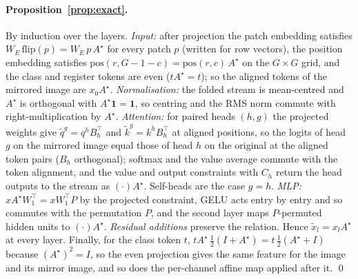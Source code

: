 \paragraph{Proposition~\ref{prop:exact}.} By induction over the layers. \emph{Input:} after projection the patch
embedding satisfies $W_E\,\mathrm{flip}(p) = W_E\,p\,A^\star$ for every patch $p$ (written for row vectors), the position
embedding satisfies $\mathrm{pos}(r, G-1-c) = \mathrm{pos}(r,c)\,A^\star$ on the $G\times G$ grid, and the class and
register tokens are even ($t A^\star = t$); so the aligned tokens of the mirrored image are $x_0 A^\star$.
\emph{Normalisation:} the folded stream is mean-centred and $A^\star$ is orthogonal with $A^\star\mathbf{1} =
\mathbf{1}$, so centring and the RMS norm commute with right-multiplication by $A^\star$. \emph{Attention:} for paired
heads $(h,g)$ the projected weights give $\tilde q^{g} = q^{h} B_h^\top$ and $\tilde k^{g} = k^{h} B_h^\top$ at aligned
positions, so the logits of head $g$ on the mirrored image equal those of head $h$ on the original at the aligned token
pairs ($B_h$ orthogonal); softmax and the value average commute with the token alignment, and the value and output
constraints with $C_h$ return the head outputs to the stream as $(\cdot)A^\star$. Self-heads are the case $g = h$.
\emph{MLP:} $x A^\star W_1^\top = x W_1^\top P$ by the projected constraint, GELU acts entry by entry and so commutes
with the permutation $P$, and the second layer maps $P$-permuted hidden units to $(\cdot)A^\star$. \emph{Residual
additions} preserve the relation. Hence $\tilde x_l = x_l A^\star$ at every layer. Finally, for the class token
$t$, $t A^\star\,\tfrac12(I + A^\star) = t\,\tfrac12(A^\star + I)$ because $(A^\star)^2 = I$, so the even projection
gives the same feature for the image and its mirror image, and so does the per-channel affine map applied after it.
\qed
